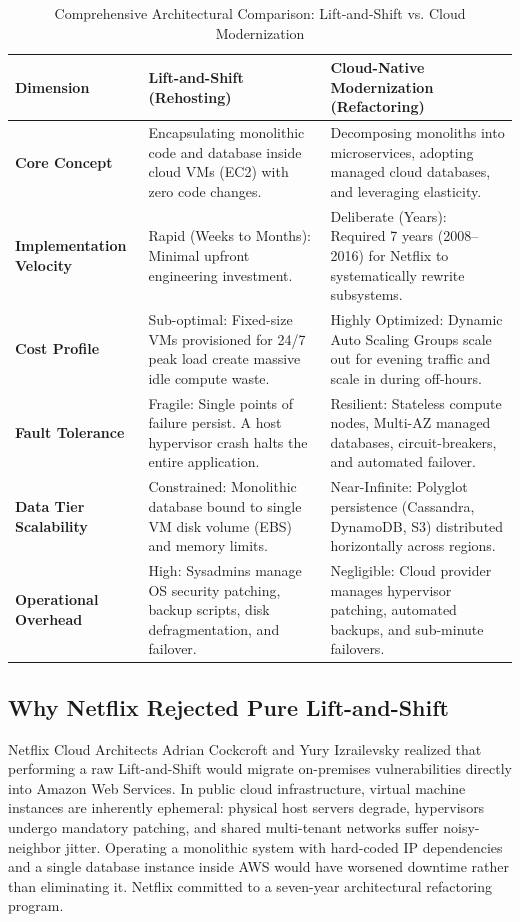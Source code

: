 \documentclass[11pt,a4paper]{article}
\begin{document}
\begin{table}[htbp]
\centering
\small
\caption{Comprehensive Architectural Comparison: Lift-and-Shift vs. Cloud Modernization}
\label{tab:strategy_comparison}
\begin{tabularx}{\textwidth}{p{3.2cm}X X}
\toprule
\textbf{Dimension} & \textbf{Lift-and-Shift (Rehosting)} & \textbf{Cloud-Native Modernization (Refactoring)} \\
\midrule
\textbf{Core Concept} & Encapsulating monolithic code and database inside cloud VMs (EC2) with zero code changes. & Decomposing monoliths into microservices, adopting managed cloud databases, and leveraging elasticity. \\
\addlinespace
\textbf{Implementation Velocity} & Rapid (Weeks to Months): Minimal upfront engineering investment. & Deliberate (Years): Required 7 years (2008--2016) for Netflix to systematically rewrite subsystems. \\
\addlinespace
\textbf{Cost Profile} & Sub-optimal: Fixed-size VMs provisioned for 24/7 peak load create massive idle compute waste. & Highly Optimized: Dynamic Auto Scaling Groups scale out for evening traffic and scale in during off-hours. \\
\addlinespace
\textbf{Fault Tolerance} & Fragile: Single points of failure persist. A host hypervisor crash halts the entire application. & Resilient: Stateless compute nodes, Multi-AZ managed databases, circuit-breakers, and automated failover. \\
\addlinespace
\textbf{Data Tier Scalability} & Constrained: Monolithic database bound to single VM disk volume (EBS) and memory limits. & Near-Infinite: Polyglot persistence (Cassandra, DynamoDB, S3) distributed horizontally across regions. \\
\addlinespace
\textbf{Operational Overhead} & High: Sysadmins manage OS security patching, backup scripts, disk defragmentation, and failover. & Negligible: Cloud provider manages hypervisor patching, automated backups, and sub-minute failovers. \\
\bottomrule
\end{tabularx}
\end{table}

\subsection{Why Netflix Rejected Pure Lift-and-Shift}
Netflix Cloud Architects Adrian Cockcroft and Yury Izrailevsky realized that performing a raw Lift-and-Shift would migrate on-premises vulnerabilities directly into Amazon Web Services. In public cloud infrastructure, virtual machine instances are inherently ephemeral: physical host servers degrade, hypervisors undergo mandatory patching, and shared multi-tenant networks suffer noisy-neighbor jitter. Operating a monolithic system with hard-coded IP dependencies and a single database instance inside AWS would have worsened downtime rather than eliminating it. Netflix committed to a seven-year architectural refactoring program.
\end{document}
